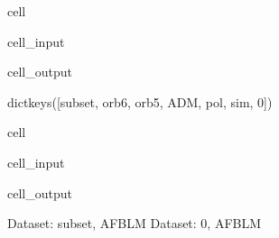 \documentclass[letterpaper,table,10pt,english]{jupyterBook}
\begin{document}
\begin{sphinxuseclass}{cell}\begin{sphinxVerbatimInput}

\begin{sphinxuseclass}{cell_input}
\begin{sphinxVerbatim}[commandchars=\\\{\}]
\end{sphinxVerbatim}

\end{sphinxuseclass}\end{sphinxVerbatimInput}
\begin{sphinxVerbatimOutput}

\begin{sphinxuseclass}{cell_output}
\begin{sphinxVerbatim}[commandchars=\\\{\}]
dict\PYGZus{}keys([\PYGZsq{}subset\PYGZsq{}, \PYGZsq{}orb6\PYGZsq{}, \PYGZsq{}orb5\PYGZsq{}, \PYGZsq{}ADM\PYGZsq{}, \PYGZsq{}pol\PYGZsq{}, \PYGZsq{}sim\PYGZsq{}, 0])
\end{sphinxVerbatim}

\end{sphinxuseclass}\end{sphinxVerbatimOutput}

\end{sphinxuseclass}
\begin{sphinxuseclass}{cell}\begin{sphinxVerbatimInput}

\begin{sphinxuseclass}{cell_input}
\begin{sphinxVerbatim}[commandchars=\\\{\}]
\end{sphinxVerbatim}

\end{sphinxuseclass}\end{sphinxVerbatimInput}
\begin{sphinxVerbatimOutput}

\begin{sphinxuseclass}{cell_output}
\begin{sphinxVerbatim}[commandchars=\\\{\}]
Dataset: subset, AFBLM
Dataset: 0, AFBLM
\end{sphinxVerbatim}

\noindent{}

\end{sphinxuseclass}\end{sphinxVerbatimOutput}

\end{sphinxuseclass}
\end{document}
